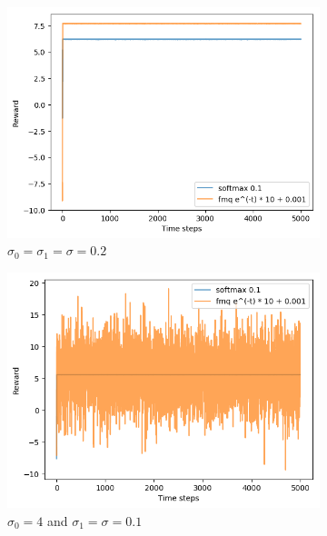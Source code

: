 \documentclass[letterpaper]{article}
\begin{document}
\begin{figure}[H]
  \begin{subfigure}{.5\textwidth}
    \centering
    \includegraphics[width=1\linewidth]{images/assign3/exa/rewards}
    \caption{$\sigma_0 = \sigma_1 = \sigma = 0.2$}
    \label{fig:climbing_rewards_exa}
  \end{subfigure}
  \begin{subfigure}{.5\textwidth}
    \centering
    \includegraphics[width=1\linewidth]{images/assign3/exb/rewards}
    \caption{$\sigma_0 = 4$ and $\sigma_1 = \sigma = 0.1$}
    \label{fig:climbing_rewards_exb}
  \end{subfigure}
  \begin{subfigure}{.5\textwidth}

\end{subfigure}
\end{figure}
\end{document}
